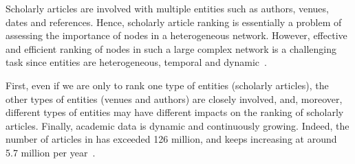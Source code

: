 



Scholarly articles are involved with multiple entities such as authors, venues, dates and references. Hence, scholarly article ranking is essentially a problem of assessing the importance of nodes in a heterogeneous network.
However, effective and efficient ranking of nodes in such a large complex network is a challenging task since entities
are heterogeneous, temporal and dynamic~\cite{AggarwalS14-survey,fcs-biggraph}.



First, even if we are only to rank one type of entities (\eg scholarly articles), the other types of entities (\eg venues and authors) are closely involved, and, moreover, different types of entities may have different impacts on the ranking of scholarly articles.
%
%
%
Finally, academic data is dynamic and continuously growing. Indeed, the number of articles in \magdata has exceeded 126 million, and keeps increasing at around 5.7 million per year~\cite{Sinha15:MAG}.



